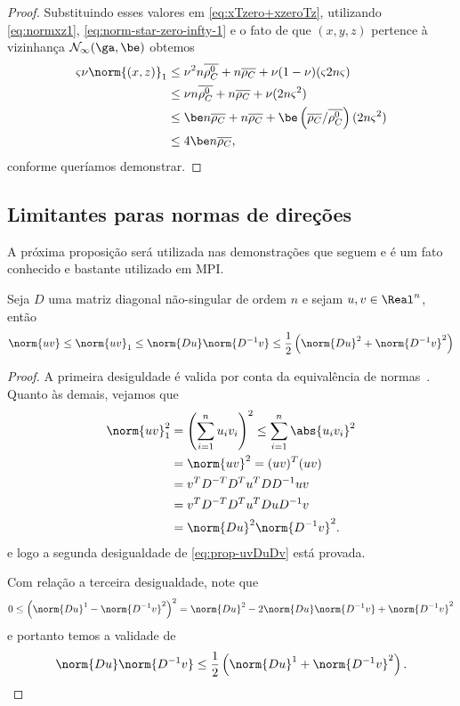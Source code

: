 \begin{proof}
Substituindo esses valores em \eqref{eq:xTzero+xzeroTz}, utilizando \eqref{eq:normxz1}, \eqref{eq:norm-star-zero-infty-1} e o fato de que $(x,y,z)$ pertence à vizinhança $\Nset_{\infty}(\ga,\be)$ obtemos
\begin{align*}
	\bdxzstar\nu\norm{(x,z)}_{1} &\leq \nu^{2}n\dbvec{\rho_C^0} + n\dbvec{\rho_C} + \nu(1-\nu)(\bdxzstar2n\bdxzstar) \\ 
								&\leq \nu n\dbvec{\rho_C^0}+ n\dbvec{\rho_C} + \nu(2n\bdxzstar^{2}) \\ 
								&\leq \be n\dbvec{\rho_C}+ n\dbvec{\rho_C} + \be\left({\dbvec{\rho_C}}/{\dbvec{\rho_C^{0}}}\right)(2n\bdxzstar^{2}) \\	
								&\leq 4\be n \dbvec{\rho_C},									
\end{align*}
conforme queríamos demonstrar.
\end{proof}





\subsection{Limitantes paras normas de direções} 

A próxima proposição será utilizada nas demonstrações que seguem e é um fato conhecido e bastante utilizado em \ac{MPI}.

\begin{prop}\label{prop:norm-uv}
	Seja $D$ uma matriz diagonal não-singular de ordem $n$ e sejam $u,v\in\Real^n$, então 
	\begin{equation}
		\label{eq:prop-uvDuDv}
		\norm{uv}\leq \norm{uv}_1 \leq \norm{Du}\norm{D^{-1}v} \leq \frac{1}{2}\left(\norm{Du}^{2} + \norm{D^{-1}v}^{2}\right)
	\end{equation}
\end{prop}
\begin{proof} A primeira desiguldade é valida por conta da equivalência de normas~\cite{Golub:1996wp}. Quanto às demais, vejamos que 
	\begin{align*}
		\norm{uv}_1^{2} & = \left( \sum_{i=1}^{n}u_i v_i  \right)^{2} \leq  \sum_{i=1}^{n}\abs{u_iv_i}^{2}\\
						& = \norm{uv}^{2} = (uv)^{T}(uv) \\
						& = v^{T}D^{-T}D^{T}u^{T}DD^{-1} uv\\
						& = v^{T}D^{-T}D^{T}u^{T}DuD^{-1}v\\
						& = \norm{Du}^{2}\norm{D^{-1}v}^{2}.
	\end{align*}
e logo a segunda desigualdade de \eqref{eq:prop-uvDuDv} está provada. 

Com relação a terceira desigualdade, note que  
\[
0 \leq \left(\norm{Du}^{1} - \norm{D^{-1}v}^{2}\right)^{2} = \norm{Du}^{2} - 2\norm{Du}\norm{D^{-1}v} + \norm{D^{-1}v}^{2}
\]
e portanto temos a validade de
\[
\norm{Du}\norm{D^{-1}v} \leq \frac{1}{2}\left(\norm{Du}^{1} + \norm{D^{-1}v}^{2}\right). \qedhere
\]
\end{proof}

